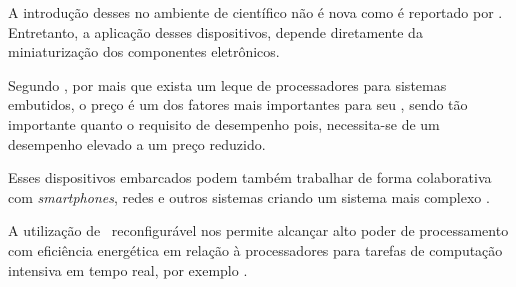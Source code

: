       A introdução desses no ambiente de científico não é nova como é reportado por \cite{Sutherland1968, Mann1996, Mann1997}.
      Entretanto, a aplicação desses dispositivos, depende diretamente da miniaturização dos componentes eletrônicos.

      Segundo \cite{Hennessy2011}, por mais que exista um leque de processadores para sistemas embutidos, o preço é um dos fatores mais importantes para seu \design, sendo tão importante quanto o requisito de desempenho pois, necessita-se de um desempenho elevado a um preço reduzido.

      Esses dispositivos embarcados podem também trabalhar de forma colaborativa com \textit{smartphones}, redes e outros sistemas criando um sistema mais complexo \cite{Jozwiak2017}.

      A utilização de \hardware\ reconfigurável nos permite alcançar alto poder de processamento com eficiência energética em relação à processadores para tarefas de computação intensiva em tempo real, por exemplo \cite{Plessl2003}.


